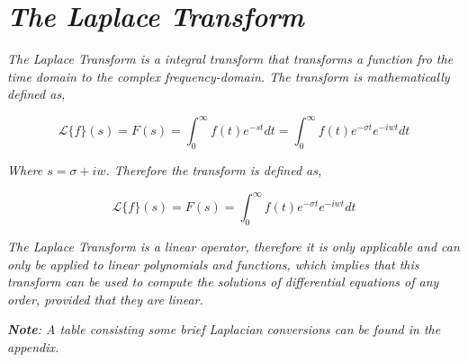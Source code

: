 

\section{\textit{The Laplace Transform}}

	\textit{The Laplace Transform is a integral transform that transforms a function fro the time domain to the complex frequency-domain. The transform is mathematically defined as,}

		$$\mathcal{L}\{f\}(s) = F(s) = \int_0^{\infty}f(t)e^{-st} dt = \int_0^{\infty}f(t)e^{-\sigma t}e^{-iwt} dt$$

	\textit{Where $s = \sigma + iw$. Therefore the transform is defined as,}
	
		$$\mathcal{L}\{f\}(s) = F(s) = \int_0^{\infty}f(t)e^{-\sigma t}e^{-iwt} dt$$
	
	\textit{The Laplace Transform is a linear operator, therefore it is only applicable and can only be applied to linear polynomials and functions, which implies that this transform can be used to compute the solutions of differential equations of any order, provided that they are linear.}
	
	\textit{\textbf{Note}: A table consisting some brief Laplacian conversions can be found in the appendix.}	
	
	
	
